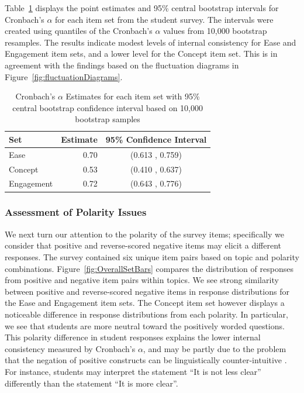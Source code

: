 \documentclass[11pt]{isuthesis}\usepackage[]{graphicx}\usepackage[]{color}
\begin{document}
Table~\ref{cronbachstuff} displays the point estimates and 95\% central bootstrap intervals for Cronbach's $\alpha$ for each item set from the student survey.  The intervals were created using quantiles of the Cronbach's $\alpha$ values from 10,000 bootstrap resamples. 
 The results indicate modest levels of internal consistency for Ease and Engagement item sets, and a lower level for the Concept item set. This is in agreement with the findings based on the fluctuation diagrams in Figure~\ref{fig:fluctuationDiagrams}. 



\begin{table}[hbtp]
\centering
\begin{tabular}{lrc}
  \hline
Set & Estimate & 95\% Confidence Interval \\ 
  \hline
Ease & 0.70 & (0.613 , 0.759)\\ 
  Concept & 0.53 & (0.410 , 0.637) \\ 
  Engagement & 0.72 & (0.643 , 0.776) \\ 
   \hline
\end{tabular}
\caption{Cronbach's $\alpha$ Estimates for each item set with 95\% central bootstrap confidence interval based on 10,000 bootstrap samples} 
\label{cronbachstuff}
\end{table}

\subsubsection{Assessment of Polarity Issues}  

We next turn our attention to the polarity of the survey items; specifically we consider that positive and reverse-scored negative items may elicit a different responses. The survey contained six unique item pairs based on topic and polarity combinations. Figure~\ref{fig:OverallSetBars} compares the distribution of responses from positive and negative item pairs within topics.  We see strong similarity between positive and reverse-scored negative items in response distributions for the Ease and Engagement item sets. The Concept item set however displays a noticeable difference in response distributions from each polarity.  In particular, we see that students are more neutral toward the positively worded questions. This polarity difference in student responses explains the lower internal consistency measured by Cronbach's $\alpha$, and may be partly due to the problem that the negation of positive constructs can be linguistically counter-intuitive \citep{Friborg2006}. For instance, students may interpret the statement ``It is not less clear'' differently than the statement ``It is more clear''.
\end{document}
